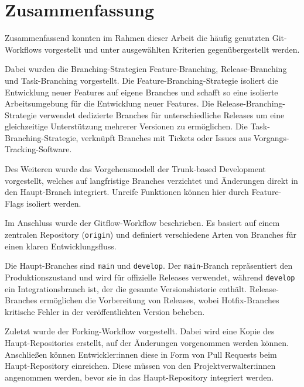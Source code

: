 
\section{Zusammenfassung}
\label{sec:zusammenfassung}

Zusammenfassend konnten im Rahmen dieser Arbeit die häufig genutzten Git\hyp Workflows vorgestellt und unter ausgewählten Kriterien gegenübergestellt werden. 

Dabei wurden die Branching\hyp Strategien Feature\hyp Branching, Release\hyp Branching und Task\hyp Branching vorgestellt. Die Feature\hyp Branching\hyp Strategie isoliert die Entwicklung neuer Features auf eigene Branches und schafft so eine isolierte Arbeitsumgebung für die Entwicklung neuer Features. Die Release\hyp Branching\hyp Strategie verwendet dedizierte Branches für unterschiedliche Releases um eine gleichzeitige Unterstützung mehrerer Versionen zu ermöglichen. Die Task\hyp Branching\hyp Strategie, verknüpft Branches mit Tickets oder Issues aus Vorgangs\hyp Tracking\hyp Software.

Des Weiteren wurde das Vorgehensmodell der Trunk\hyp based Development vorgestellt, welches auf langfristige Branches verzichtet und Änderungen direkt in den Haupt\hyp Branch integriert. Unreife Funktionen können hier durch Feature\hyp Flags isoliert werden.

Im Anschluss wurde der Gitflow\hyp Workflow beschrieben. Es basiert auf einem zentralen Repository (\texttt{origin}) und definiert verschiedene Arten von Branches für einen klaren Entwicklungsfluss.

Die Haupt\hyp Branches sind \texttt{main} und \texttt{develop}. Der \texttt{main}-Branch repräsentiert den Produktionszustand und wird für offizielle Releases verwendet, während \texttt{develop} ein Integrationsbranch ist, der die gesamte Versionshistorie enthält. Release\hyp Branches ermöglichen die Vorbereitung von Releases, wobei Hotfix\hyp Branches kritische Fehler in der veröffentlichten Version beheben.

Zuletzt wurde der Forking\hyp Workflow vorgestellt. Dabei wird eine Kopie des Haupt\hyp Repositories erstellt, auf der Änderungen vorgenommen werden können. Anschließen können Entwickler:innen diese in Form von Pull Requests beim Haupt\hyp Repository einreichen. Diese müssen von den Projektverwalter:innen angenommen werden, bevor sie in das Haupt\hyp Repository integriert werden.


